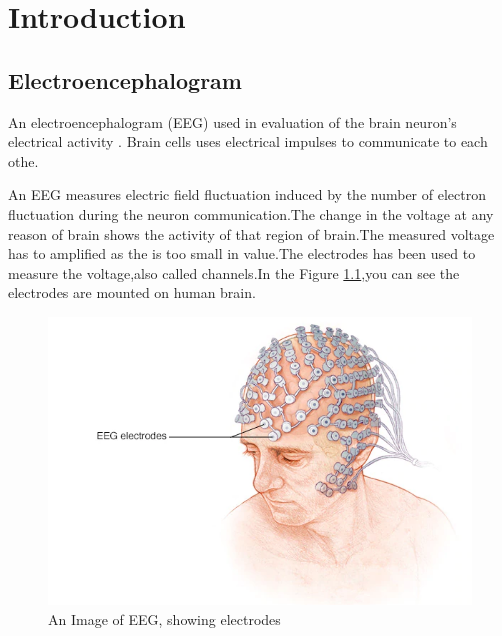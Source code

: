 
\chapter{Introduction} %

\label{Chapter1} %


\section{Electroencephalogram}
An electroencephalogram (EEG) used in evaluation of the brain neuron's electrical activity  . Brain cells uses electrical impulses to communicate to each othe.

An EEG measures electric field fluctuation induced by the  number of electron fluctuation during the neuron communication.The change in the voltage at any reason of brain shows the activity of that region of brain.The measured voltage has to amplified as the is too small in value.The electrodes has been used to measure the voltage,also called channels.In the Figure \ref{fig:eeg},you can see the electrodes are mounted on human brain.
 \begin{figure}
     \centering
     \includegraphics[width=15cm]{Pictures/eeg_1.png}
     \caption{An Image of EEG, showing electrodes \cite{eeg} }
     \label{fig:eeg}
 \end{figure}
